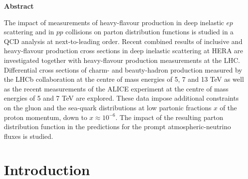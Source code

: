 \documentclass[12pt]{article}
\begin{document}
\begin{titlepage}
  \vspace{1.0cm}
\begin{center}
\large
{\bf Abstract}
\vspace{-0.2cm}
\end{center}
The impact of measurements of heavy-flavour production in deep inelastic $ep$ scattering and
in $pp$ collisions on parton distribution functions is studied in a QCD analysis at next-to-leading order. 
Recent combined results of inclusive and heavy-flavour production cross sections in deep inelastic scattering at HERA are 
investigated together with heavy-flavour production measurements at the LHC. Differential cross sections of charm- and 
beauty-hadron production measured by the LHCb collaboration at the centre of mass energies of 5, 7 and 13 TeV as well 
as the recent measurements of the ALICE experiment at the centre of mass energies of 5 and 7 TeV are explored. 
These data impose additional constraints on the gluon and the sea-quark distributions at low partonic fractions
$x$ of the proton momentum, down to $x\approx10^{-6}$. The impact of the resulting parton distribution function in the predictions for the prompt atmospheric-neutrino fluxes is studied.


\vfill
\end{titlepage}


%
%
\newpage

\section{Introduction}
\label{sect:intro}
\end{document}

